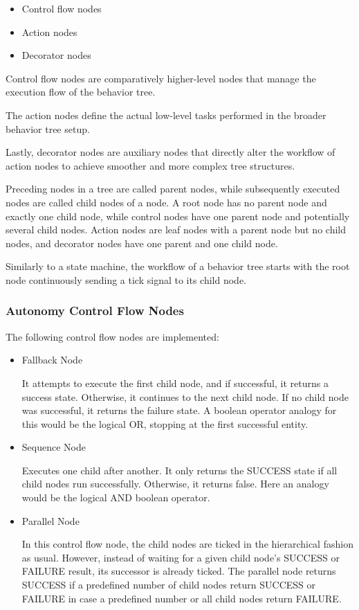 \documentclass{article}
\begin{document}
\begin{itemize}
    \item Control flow nodes
    \item Action nodes
    \item Decorator nodes
    \end{itemize}
    
    Control flow nodes are comparatively higher-level nodes that manage the execution flow of the behavior tree.
    
    The action nodes define the actual low-level tasks performed in the broader behavior tree setup. 
    
    Lastly, decorator nodes are auxiliary nodes that directly alter the workflow of action nodes to achieve smoother and more complex tree structures.
    
    Preceding nodes in a tree are called parent nodes, while subsequently executed nodes are called child nodes of a node. A root node has no parent node and exactly one child node, while control nodes have one parent node and potentially several child nodes. Action nodes are leaf nodes with a parent node but no child nodes, and decorator nodes have one parent and one child node.

    Similarly to a state machine, the workflow of a behavior tree starts with the root node continuously sending a tick signal to its child node. 

    

\subsubsection{Autonomy Control Flow Nodes}

The following control flow nodes are implemented:

\begin{itemize}
    \item Fallback Node
    
    It attempts to execute the first child node, and if successful, it returns a success state. Otherwise, it continues to the next child node. If no child node was successful, it returns the failure state. A boolean operator analogy for this would be the logical OR, stopping at the first successful entity.
    \item Sequence Node
    
    Executes one child after another. It only returns the SUCCESS state if all child nodes run successfully. Otherwise, it returns false. Here an analogy would be the logical AND boolean operator.

    \item Parallel Node
    
    In this control flow node, the child nodes are ticked in the hierarchical fashion as usual. However, instead of waiting for a given child node's SUCCESS or FAILURE result, its successor is already ticked. The parallel node returns SUCCESS if a predefined number of child nodes return SUCCESS or FAILURE in case a predefined number or all child nodes return FAILURE.
\end{itemize}
\end{document}
